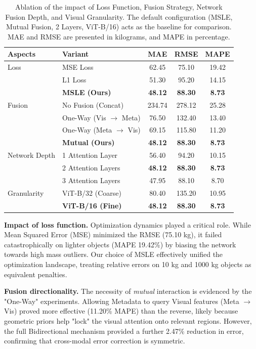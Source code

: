 \documentclass[journal,twoside,web]{ieeecolor}
\begin{document}
\begin{table}[!ht]
\centering
\scriptsize
\caption{Ablation of the impact of Loss Function, Fusion Strategy, Network Fusion Depth, and Visual Granularity. The default configuration (MSLE, Mutual Fusion, 2 Layers, ViT-B/16) acts as the baseline for comparison. MAE and RMSE are presented in kilograms, and MAPE in percentage.}
\label{tab:ablation_results}
\begin{tabular}{llccc}
\midrule
\textbf{Aspects} & \textbf{Variant} & \textbf{MAE} & \textbf{RMSE} & \textbf{MAPE} \\
\midrule
{Loss} 
 & MSE Loss & 62.45 & 75.10 & 19.42 \\
 & L1 Loss & 51.30 & 95.20 & 14.15 \\
 & \textbf{MSLE (Ours)} & \textbf{48.12} & \textbf{88.30} & \textbf{8.73} \\
{Fusion} 
 & No Fusion (Concat) & 234.74 & 278.12 & 25.28 \\
 & One-Way (Vis $\to$ Meta) & 76.50 & 132.40 & 13.40 \\
 & One-Way (Meta $\to$ Vis) & 69.15 & 115.80 & 11.20 \\
 & \textbf{Mutual (Ours)} & \textbf{48.12} & \textbf{88.30} & \textbf{8.73} \\
{Network Depth} 
 & 1 Attention Layer & 56.40 & 94.20 & 10.15 \\
 & 2 Attention Layers & \textbf{48.12} & \textbf{88.30} & \textbf{8.73} \\
 & 3 Attention Layers & 47.95 & 88.10 & 8.70 \\
{Granularity} 
 & ViT-B/32 (Coarse) & 80.40 & 135.20 & 10.95 \\
 & \textbf{ViT-B/16 (Fine)} & \textbf{48.12} & \textbf{88.30} & \textbf{8.73} \\
\midrule
\end{tabular}%
\end{table}

\noindent \textbf{Impact of loss function.} Optimization dynamics played a critical role. While Mean Squared Error (MSE) minimized the RMSE (75.10 kg), it failed catastrophically on lighter objects (MAPE 19.42\%) by biasing the network towards high mass outliers. Our choice of MSLE effectively unified the optimization landscape, treating relative errors on 10 kg and 1000 kg objects as equivalent penalties.

\noindent \textbf{Fusion directionality.} The necessity of \textit{mutual} interaction is evidenced by the "One-Way" experiments. Allowing Metadata to query Visual features (Meta $\to$ Vis) proved more effective (11.20\% MAPE) than the reverse, likely because geometric priors help "lock" the visual attention onto relevant regions. However, the full Bidirectional mechanism provided a further 2.47\% reduction in error, confirming that cross-modal error correction is symmetric.
\end{document}
